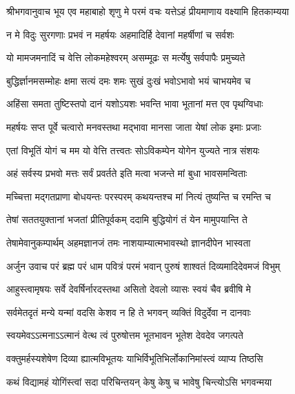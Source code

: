 {श्रीभगवानुवाच}
\twolineshloka
{भूय एव महाबाहो शृणु मे परमं वचः}
{यत्तेऽहं प्रीयमाणाय वक्ष्यामि हितकाम्यया}%

\twolineshloka
{न मे विदुः सुरगणाः प्रभवं न महर्षयः}
{अहमादिर्हि देवानां महर्षीणां च सर्वशः}%

\twolineshloka
{यो मामजमनादिं च वेत्ति लोकमहेश्वरम्}
{असम्मूढः स मर्त्येषु सर्वपापैः प्रमुच्यते}%

\twolineshloka
{बुद्धिर्ज्ञानमसम्मोहः क्षमा सत्यं दमः शमः}
{सुखं दुःखं भवोऽभावो भयं चाभयमेव च}%

\twolineshloka
{अहिंसा समता तुष्टिस्तपो दानं यशोऽयशः}
{भवन्ति भावा भूतानां मत्त एव पृथग्विधाः}%

\twolineshloka
{महर्षयः सप्त पूर्वे चत्वारो मनवस्तथा}
{मद्भावा मानसा जाता येषां लोक इमाः प्रजाः}%

\twolineshloka
{एतां विभूतिं योगं च मम यो वेत्ति तत्त्वतः}
{सोऽविकम्पेन योगेन युज्यते नात्र संशयः}%

\twolineshloka
{अहं सर्वस्य प्रभवो मत्तः सर्वं प्रवर्तते}
{इति मत्वा भजन्ते मां बुधा भावसमन्विताः}%

\twolineshloka
{मच्चित्ता मद्गतप्राणा बोधयन्तः परस्परम्}
{कथयन्तश्च मां नित्यं तुष्यन्ति च रमन्ति च}%

\twolineshloka
{तेषां सततयुक्तानां भजतां प्रीतिपूर्वकम्}
{ददामि बुद्धियोगं तं येन मामुपयान्ति ते}%

\twolineshloka
{तेषामेवानुकम्पार्थम् अहमज्ञानजं तमः}
{नाशयाम्यात्मभावस्थो ज्ञानदीपेन भास्वता}%

{अर्जुन उवाच}
\twolineshloka
{परं ब्रह्म परं धाम पवित्रं परमं भवान्}
{पुरुषं शाश्वतं दिव्यमादिदेवमजं विभुम्}%

\twolineshloka
{आहुस्त्वामृषयः सर्वे देवर्षिर्नारदस्तथा}
{असितो देवलो व्यासः स्वयं चैव ब्रवीषि मे}%

\twolineshloka
{सर्वमेतदृतं मन्ये यन्मां वदसि केशव}
{न हि ते भगवन् व्यक्तिं विदुर्देवा न दानवाः}%

\twolineshloka
{स्वयमेवऽऽत्मनाऽऽत्मानं वेत्थ त्वं पुरुषोत्तम}
{भूतभावन भूतेश देवदेव जगत्पते}%

\twolineshloka
{वक्तुमर्हस्यशेषेण दिव्या ह्यात्मविभूतयः}
{याभिर्विभूतिभिर्लोकानिमांस्त्वं व्याप्य तिष्ठसि}%

\twolineshloka
{कथं विद्यामहं योगिंस्त्वां सदा परिचिन्तयन्}
{केषु केषु च भावेषु चिन्त्योऽसि भगवन्मया}%

